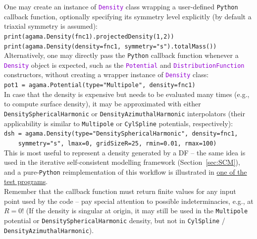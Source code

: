 \documentclass[12pt]{article}
\newcommand{\Python}{\texttt{Python}\xspace}
\newcommand{\ttt}[1]{\textcolor{darkviolet}{\texttt{#1}}}
\newcommand{\ppp}[1]{\textcolor{darkolive} {\texttt{#1}}}
\begin{document}
One may create an instance of \ttt{Density} class wrapping a user-defined \Python callback function, optionally specifying its symmetry level explicitly (by default a triaxial symmetry is assumed):\\
\texttt{print(agama.Density(fnc1).projectedDensity(1,2))}\\
\texttt{print(agama.Density(density=fnc1, symmetry="s").totalMass())}\\[2mm]
Alternatively, one may directly pass the \Python callback function whenever a \ttt{Density} object is expected, such as the \ttt{Potential} and \ttt{DistributionFunction} constructors, without creating a wrapper instance of \ttt{Density} class: \\
\texttt{pot1 = agama.Potential(type="Multipole", density=fnc1)}\\[2mm]
In case that the density is expensive but needs to be evaluated many times (e.g., to compute surface density), it may be approximated with either \ppp{DensitySphericalHarmonic} or \ppp{DensityAzimuthalHarmonic} interpolators (their applicability is similar to \ppp{Multipole} or \ppp{CylSpline} potentials, respectively): \\
\texttt{dsh = agama.Density(type="DensitySphericalHarmonic", density=fnc1, \\
\mbox{}~~~~symmetry="s", lmax=0, gridSizeR=25, rmin=0.01, rmax=100)}\\
This is most useful to represent a density generated by a DF -- the same idea is used in the iterative self-consistent modelling framework (Section~\ref{sec:SCM}), and a pure-\Python reimplementation of this workflow is illustrated in \hyperref[sec:ExampleSCM]{one of the test programs}.\\[2mm]
Remember that the callback function must return finite values for any input point used by the code -- pay special attention to possible indeterminacies, e.g., at $R=0$! (If the density is singular at origin, it may still be used in the \ppp{Multipole} potential or \ppp{DensitySphericalHarmonic} density, but not in \ppp{CylSpline} / \ppp{DensityAzimuthalHarmonic}).
\end{document}
